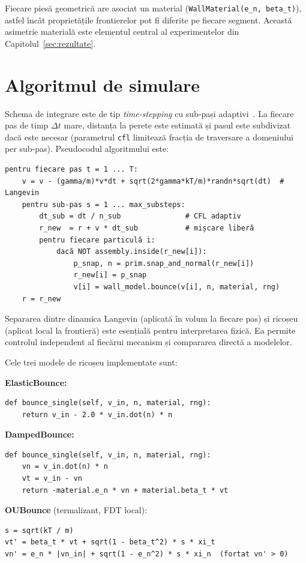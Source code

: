 \documentclass[12pt,openright,twoside]{book}
\begin{document}
Fiecare piesă geometrică are asociat un material (\texttt{WallMaterial(e\_n, beta\_t)}), astfel încât proprietățile frontierelor pot fi diferite pe fiecare segment. Această asimetrie materială este elementul central al experimentelor din Capitolul~\ref{sec:rezultate}.

\section{Algoritmul de simulare}

Schema de integrare este de tip \emph{time-stepping} cu sub-pași adaptivi~\cite{verlet1967,leimkuhler2013baoab,leimkuhler2015,tuckerman2010}. La fiecare pas de timp $\Delta t$ mare, distanța la perete este estimată și pasul este subdivizat dacă este necesar (parametrul \texttt{cfl} limitează fracția de traversare a domeniului per sub-pas). Pseudocodul algoritmului este:

\begin{verbatim}
pentru fiecare pas t = 1 ... T:
    v = v - (gamma/m)*v*dt + sqrt(2*gamma*kT/m)*randn*sqrt(dt)  # Langevin
    pentru sub-pas s = 1 ... max_substeps:
        dt_sub = dt / n_sub               # CFL adaptiv
        r_new  = r + v * dt_sub           # mișcare liberă
        pentru fiecare particulă i:
            dacă NOT assembly.inside(r_new[i]):
                p_snap, n = prim.snap_and_normal(r_new[i])
                r_new[i] = p_snap
                v[i] = wall_model.bounce(v[i], n, material, rng)
    r = r_new
\end{verbatim}

Separarea dintre dinamica Langevin (aplicată în volum la fiecare pas) și ricoșeu (aplicat local la frontieră) este esențială pentru interpretarea fizică. Ea permite controlul independent al fiecărui mecanism și compararea directă a modelelor.

Cele trei modele de ricoșeu implementate sunt:

\textbf{ElasticBounce:}
\begin{verbatim}
def bounce_single(self, v_in, n, material, rng):
    return v_in - 2.0 * v_in.dot(n) * n
\end{verbatim}

\textbf{DampedBounce:}
\begin{verbatim}
def bounce_single(self, v_in, n, material, rng):
    vn = v_in.dot(n) * n
    vt = v_in - vn
    return -material.e_n * vn + material.beta_t * vt
\end{verbatim}

\textbf{OUBounce} (termalizant, FDT local):
\begin{verbatim}
s = sqrt(kT / m)
vt' = beta_t * vt + sqrt(1 - beta_t^2) * s * xi_t
vn' = e_n * |vn_in| + sqrt(1 - e_n^2) * s * xi_n  (fortat vn' > 0)
\end{verbatim}
\end{document}
